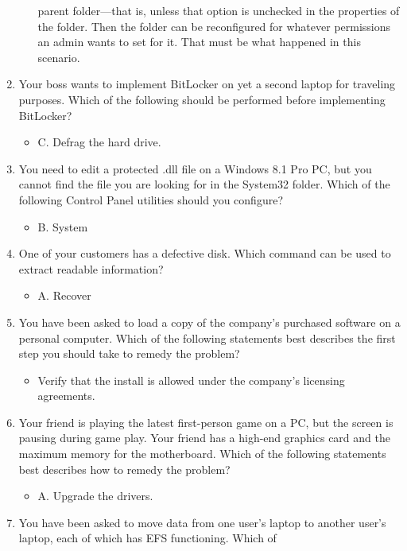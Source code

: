 \documentclass{article}
\begin{document}
\begin{enumerate}
\begin{itemize}
parent folder—that is, unless that option is unchecked in the properties of the folder.
Then the folder can be reconfigured for whatever permissions an admin wants to set
for it. That must be what happened in this scenario.
    \end{itemize}
    \item Your boss wants to implement BitLocker on yet a second laptop
for traveling purposes. Which of the following should be performed
before implementing BitLocker?
    \begin{itemize}
        \item C. Defrag the hard drive.
    \end{itemize}
    \item You need to edit a protected .dll file on a Windows 8.1 Pro PC, but
you cannot find the file you are looking for in the System32 folder.
Which of the following Control Panel utilities should you configure?
    \begin{itemize}
        \item B. System
    \end{itemize}
    \item One of your customers has a defective disk. Which command
can be used to extract readable information?
    \begin{itemize}
        \item A. Recover
    \end{itemize}
    \item You have been asked to load a copy of the company’s purchased
software on a personal computer. Which of the following statements
best describes the first step you should take to remedy the
problem?
    \begin{itemize}
        \item Verify that the install is allowed under the company’s
licensing agreements.
    \end{itemize}
    \item Your friend is playing the latest first-person game on a PC, but the
screen is pausing during game play. Your friend has a high-end
graphics card and the maximum memory for the motherboard.
Which of the following statements best describes how to remedy
the problem?
    \begin{itemize}
        \item A. Upgrade the drivers.
    \end{itemize}
    \item You have been asked to move data from one user’s laptop to
another user’s laptop, each of which has EFS functioning. Which of

\end{enumerate}
\end{document}
